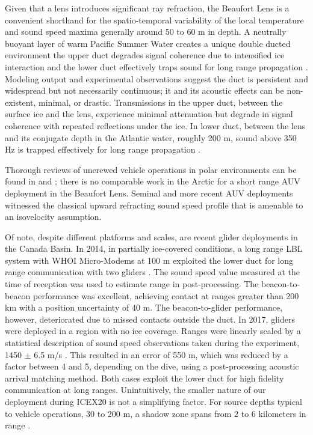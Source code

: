 Given that a lens introduces significant ray refraction, the Beaufort Lens is a convenient shorthand for the spatio-temporal variability of the local temperature and sound speed maxima generally around 50 to 60 m in depth.
A neutrally buoyant layer of warm Pacific Summer Water creates a unique double ducted environment \textemdash the upper duct degrades signal coherence due to intensified ice interaction and the lower duct effectively traps sound for long range propagation \citep{poulsen_acoustic_2016}. 
 Modeling output \citep{duda_long-range_2019,duda_effects_2021} and experimental observations \citep{ballard_temporal_2020,Bhatt2021} suggest the duct is persistent and widespread but not necessarily continuous; it and its acoustic effects can be non-existent, minimal, or drastic.
Transmissions in the upper duct, between the surface ice and the lens, experience minimal attenuation but degrade in signal coherence with repeated reflections under the ice.
In lower duct, between the lens and its conjugate depth in the Atlantic water, roughly 200 m, sound above 350 Hz is trapped effectively for long range propagation \citep{poulsen2016acoustic}.

Thorough reviews of uncrewed vehicle operations in polar environments can be found in \citep{norgren_unmanned_2014} and \citep{barker_scientific_2020}; there is no comparable work in the Arctic for a short range AUV deployment in the Beaufort Lens.
Seminal \citep{brooke1981arcs,jackson1983autonomous,light1989autonomous,bellingham1995auv,hayes2002determining} and more recent AUV deployments \citep{jakuba2008long,kunz_deep_2008,kukulya2010under,plueddemann_autonomous_2012,timmermans2013scales,fossum2021adaptive} witnessed the classical upward refracting sound speed profile that is amenable to an isovelocity assumption.

Of note, despite different platforms and scales, are recent glider deployments in the Canada Basin.
In 2014, in partially ice-covered conditions, a long range LBL system with WHOI Micro-Modems at 100 m exploited the lower duct for long range communication with two gliders \citep{freitag_long_2015,webster2015towards}.
The sound speed value measured at the time of reception was used to estimate range in post-processing.
The beacon-to-beacon performance was excellent, achieving contact at ranges greater than 200 km with a position uncertainty of 40 m.
The beacon-to-glider performance, however, deteriorated due to missed contacts outside the duct.
In 2017, gliders were deployed in a region with no ice coverage. 
Ranges were linearly scaled by a statistical description of sound speed observations taken during the experiment, 1450 $\pm$ 6.5 m/s \citep{graupe2019preliminary}.
This resulted in an error of 550 m, which was reduced by a factor between 4 and 5, depending on the dive, using a post-processing acoustic arrival matching method.
Both cases exploit the lower duct for high fidelity communication at long ranges.
Unintuitively, the smaller nature of our deployment during ICEX20 is not a simplifying factor.
For source depths typical to vehicle operations, 30 to 200 m, a shadow zone spans from 2 to 6 kilometers in range \citep{schmidt2016acoustic}.

